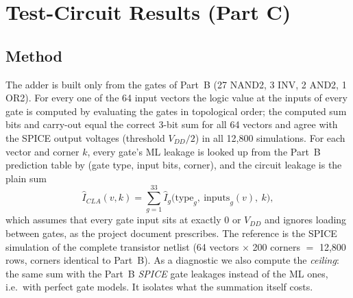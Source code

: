 \section{Test-Circuit Results (Part C)}\label{sec:circuit}

\subsection{Method}\label{sec:circuit:method}
The adder is built only from the gates of Part~B (27 NAND2, 3 INV, 2 AND2, 1 OR2). For every one of the 64 input vectors the logic value at the inputs of every gate is computed by evaluating the gates in topological order; the computed sum bits and carry-out equal the correct 3-bit sum for all 64 vectors and agree with the SPICE output voltages (threshold $V_{DD}/2$) in all 12,800 simulations.
For each vector and corner $k$, every gate's ML leakage is looked up from the Part~B prediction table by (gate type, input bits, corner), and the circuit leakage is the plain sum
\begin{equation}
\hat I_{CLA}(v,k)=\sum_{g=1}^{33}\hat I_{g}\bigl(\text{type}_g,\ \text{inputs}_g(v),\ k\bigr),
\label{eq:cla}
\end{equation}
which assumes that every gate input sits at exactly 0 or $V_{DD}$ and ignores loading between gates, as the project document prescribes. The reference is the SPICE simulation of the complete transistor netlist (64 vectors $\times$ 200 corners $=$ 12,800 rows, corners identical to Part~B).
As a diagnostic we also compute the \emph{ceiling}: the same sum with the Part~B \emph{SPICE} gate leakages instead of the ML ones, i.e.\ with perfect gate models. It isolates what the summation itself costs.

